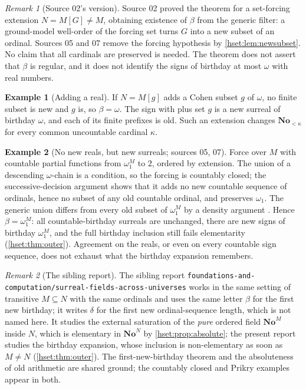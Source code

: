 \documentclass[11pt,letterpaper]{article}
\theoremstyle{definition}
\newtheorem{example}[example]{Example}\aliascntresetthe{example}
\theoremstyle{remark}
\newtheorem{remark}[remark]{Remark}\aliascntresetthe{remark}
\newcommand{\No}{\mathbf{No}}
\newcommand{\repo}[1]{\nolinkurl{#1}}
\begin{document}
\begin{remark}[Source 02's version]\label{hset:rem:firstbirthday-02}
Source 02 proved the theorem for a set-forcing extension $N=M[G]\ne M$,
obtaining existence of $\beta$ from the generic filter: a ground-model
well-order of the forcing set turns $G$ into a new subset of an ordinal. Sources
05 and 07 remove the forcing hypothesis by \cref{hset:lem:newsubset}. No claim
that all cardinals are preserved is needed. The theorem does not assert that
$\beta$ is regular, and it does not identify the signs of birthday at most
$\omega$ with real numbers.
\end{remark}

\begin{example}[Adding a real]\label{hset:ex:cohen}
If $N=M[g]$ adds a Cohen subset $g$ of $\omega$, no finite subset is new and $g$
is, so $\beta=\omega$. The sign with plus set $g$ is a new surreal of birthday
$\omega$, and each of its finite prefixes is old. Such an extension changes
$\No_{<\kappa}$ for every common uncountable cardinal $\kappa$.
\end{example}

\begin{example}[No new reals, but new surreals; sources 05, 07]\label{hset:ex:closed}
Force over $M$ with countable partial functions from $\omega_1^M$ to $2$,
ordered by extension. The union of a descending $\omega$-chain is a condition,
so the forcing is countably closed; the successive-decision argument shows that
it adds no new countable sequence of ordinals, hence no subset of any old
countable ordinal, and preserves $\omega_1$. The generic union differs from
every old subset of $\omega_1^M$ by a density argument \cite{Jech}. Hence
$\beta=\omega_1^M$: all countable-birthday surreals are unchanged, there are
new signs of birthday $\omega_1^M$, and the full birthday inclusion still fails
elementarity (\cref{hset:thm:outer}). Agreement on the reals, or even on every
countable sign sequence, does not exhaust what the birthday expansion remembers.
\end{example}

\begin{remark}[The sibling report]\label{hset:rem:sibling}
The sibling report
\repo{foundations-and-computation/surreal-fields-across-universes} works in the
same setting of transitive $M\subseteq N$ with the same ordinals and uses the
same letter $\beta$ for the first new birthday; it writes $\delta$ for the first
new ordinal-sequence length, which is not named here. It studies the external
saturation of the \emph{pure} ordered field $\No^M$ inside $N$, which is
elementary in $\No^N$ by \cref{hset:prop:absolute}; the present report studies
the birthday expansion, whose inclusion is non-elementary as soon as $M\ne N$
(\cref{hset:thm:outer}). The first-new-birthday theorem and the absoluteness of
old arithmetic are shared ground; the countably closed and Prikry examples
appear in both.
\end{remark}
\end{document}
